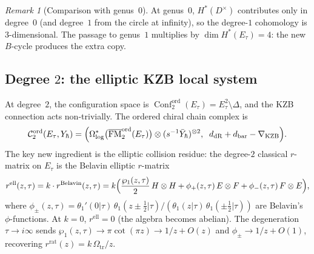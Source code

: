 \documentclass[11pt,reqno]{amsart}
\theoremstyle{definition}
\theoremstyle{remark}
\newtheorem{remark}[theorem]{Remark}
\newcommand{\cC}{\mathcal{C}}
\DeclareMathOperator{\Conf}{Conf}
\DeclareMathOperator{\FM}{FM}
\numberwithin{equation}{section}
\begin{document}
\begin{remark}[Comparison with genus~$0$]
At genus~$0$, $H^*(D^\times)$ contributes only in degree~$0$
(and degree~$1$ from the circle at infinity), so the
degree-$1$ cohomology is $3$-dimensional. The passage to
genus~$1$ multiplies by $\dim H^*(E_\tau) = 4$: the new
$B$-cycle produces the extra copy.
\end{remark}

\subsection{Degree $2$: the elliptic KZB local system}
\label{subsec:ell-degree2}

At degree~$2$, the configuration space is
$\Conf_2^{\mathrm{ord}}(E_\tau) = E_\tau^2 \setminus
\Delta$, and the KZB connection acts non-trivially.
The ordered chiral chain complex is
\begin{equation}\label{eq:ell-degree2-cx}
  \cC_2^{\mathrm{ord}}(E_\tau, Y_\hbar)
  = \Bigl(
  \Omega^*_{\log}\bigl(
  \overline{\FM}_2^{\mathrm{ord}}(E_\tau)\bigr)
  \otimes (s^{-1}\bar{Y}_\hbar)^{\otimes 2},
  \;\;
  d_{\mathrm{dR}} + d_{\mathrm{bar}}
  - \nabla_{\mathrm{KZB}}
  \Bigr).
\end{equation}
The key new ingredient is the elliptic collision residue:
the degree-$2$ classical $r$-matrix on $E_\tau$ is the
Belavin elliptic $r$-matrix
\begin{equation}\label{eq:belavin-r}
  r^{\mathrm{ell}}(z, \tau)
  = k \cdot r^{\mathrm{Belavin}}(z, \tau)
  = k \Bigl(
  \frac{\wp_1(z, \tau)}{2}\,H \otimes H
  + \phi_+(z, \tau)\,E \otimes F
  + \phi_-(z, \tau)\,F \otimes E
  \Bigr),
\end{equation}
where $\phi_\pm(z, \tau) = \theta_1'(0|\tau)\,
\theta_1(z \pm \tfrac{1}{2}|\tau) /
(\theta_1(z|\tau)\,\theta_1(\pm\tfrac{1}{2}|\tau))$
are Belavin's $\phi$-functions. At $k = 0$,
$r^{\mathrm{ell}} = 0$ (the algebra becomes abelian).
The degeneration
$\tau \to i\infty$ sends
$\wp_1(z, \tau) \to \pi\cot(\pi z) \to 1/z + O(z)$
and $\phi_\pm \to 1/z + O(1)$, recovering
$r^{\mathrm{rat}}(z) = k\,\Omega_{\mathrm{tr}}/z$.
\end{document}
